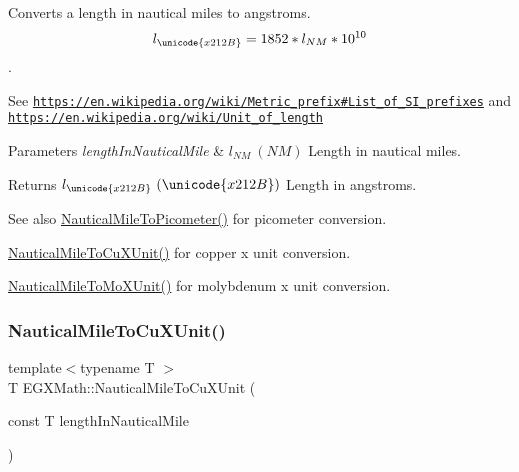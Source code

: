 Converts a length in nautical miles to angstroms. \[ l_{\unicode{x212B}}=1852 * l_{NM} * 10^{10} \]. 

See \href{https://en.wikipedia.org/wiki/Metric_prefix#List_of_SI_prefixes}{\tt https\+://en.\+wikipedia.\+org/wiki/\+Metric\+\_\+prefix\#\+List\+\_\+of\+\_\+\+S\+I\+\_\+prefixes} and \href{https://en.wikipedia.org/wiki/Unit_of_length}{\tt https\+://en.\+wikipedia.\+org/wiki/\+Unit\+\_\+of\+\_\+length} 
\begin{DoxyParams}{Parameters}
{\em length\+In\+Nautical\+Mile} & $ l_{NM}\ (NM)$ Length in nautical miles. \\
\hline
\end{DoxyParams}
\begin{DoxyReturn}{Returns}
$ l_{\unicode{x212B}}\ (\unicode{x212B})$ Length in angstroms. 
\end{DoxyReturn}
\begin{DoxySeeAlso}{See also}
\mbox{\hyperlink{group___e_g_x_math-_conversions-_length_conversions-_non-_s_i-_nautical_mile-_s_i_ga5ab6a92054685d45fb032111bcde94e0}{Nautical\+Mile\+To\+Picometer()}} for picometer conversion. 

\mbox{\hyperlink{group___e_g_x_math-_conversions-_length_conversions-_non-_s_i-_nautical_mile-_non-_s_i_gaa0638917756d520cfc0877dcde60d777}{Nautical\+Mile\+To\+Cu\+X\+Unit()}} for copper x unit conversion. 

\mbox{\hyperlink{group___e_g_x_math-_conversions-_length_conversions-_non-_s_i-_nautical_mile-_non-_s_i_ga17cfe98568d00c2e0b1c0b5d19f1b34e}{Nautical\+Mile\+To\+Mo\+X\+Unit()}} for molybdenum x unit conversion. 
\end{DoxySeeAlso}
\mbox{\label{group___e_g_x_math-_conversions-_length_conversions-_non-_s_i-_nautical_mile-_non-_s_i_gaa0638917756d520cfc0877dcde60d777}} 
\subsubsection{\texorpdfstring{Nautical\+Mile\+To\+Cu\+X\+Unit()}{NauticalMileToCuXUnit()}}
{\footnotesize\ttfamily template$<$typename T $>$ \\
T E\+G\+X\+Math\+::\+Nautical\+Mile\+To\+Cu\+X\+Unit (\begin{DoxyParamCaption}\item[{const T}]{length\+In\+Nautical\+Mile }\end{DoxyParamCaption})}



